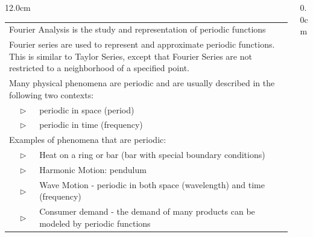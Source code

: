 \begin{frame}
\frametitle{\Large {\color[rgb]{0.02,0.20,1.0} }}
\scriptsize
\begin{columns}\begin{column}{12.0cm}

	\setlength{\extrarowheight}{0.4cm}
	\begin{tabular}{p{0.5cm}p{0.2cm}p{10cm}}
		\multicolumn{3}{p{12cm}}{Fourier Analysis is the study and representation of periodic functions} \\
		\multicolumn{3}{p{12cm}}{Fourier series are used to represent and approximate periodic functions.  This is similar to Taylor Series, except that Fourier Series are not restricted to a neighborhood of a specified point. } \\
		\multicolumn{3}{p{12cm}}{Many physical phenomena are periodic and are usually described in the following two contexts:}\\
		&$\rhd$ & periodic in space (period) \\
		&$\rhd$ & periodic in time (frequency) \\
		\multicolumn{3}{p{12cm}}{Examples of phenomena that are periodic:} \\
		&$\rhd$ & Heat on a ring or bar (bar with special boundary conditions)\\
		&$\rhd$ & Harmonic Motion: pendulum\\
		&$\rhd$ & Wave Motion - periodic in both space (wavelength) and time (frequency)\\
		&$\rhd$ & Consumer demand - the demand of many products can be modeled by periodic functions\\
	\end{tabular}
%

\end{column}\begin{column}{0.0cm}\end{column}\end{columns}
\end{frame}

